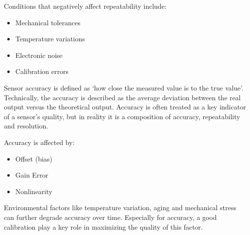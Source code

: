 \noindent\cite{LRWeb:52}

Conditions that negatively affect repeatability include:
\begin{itemize}
    \item Mechanical tolerances
    \item Temperature variations
    \item Electronic noise
    \item Calibration errors
\end{itemize}

\noindent\cite{LRWeb:52}

Sensor accuracy is defined as `how close the measured value is to the true value'. Technically, the accuracy is described as the average deviation between the real output versus the theoretical output. Accuracy is often treated as a key indicator of a sensor's quality, but in reality it is a composition of accuracy, repeatability and resolution. 

Accuracy is affected by:
\begin{itemize}
    \item Offset (bias)
    \item Gain Error
    \item Nonlinearity
\end{itemize}

Environmental factors like temperature variation, aging and mechanical stress can further degrade accuracy over time. Especially for accuracy, a good calibration play a key role in maximizing the quality of this factor.

\noindent\cite{LRWeb:52}